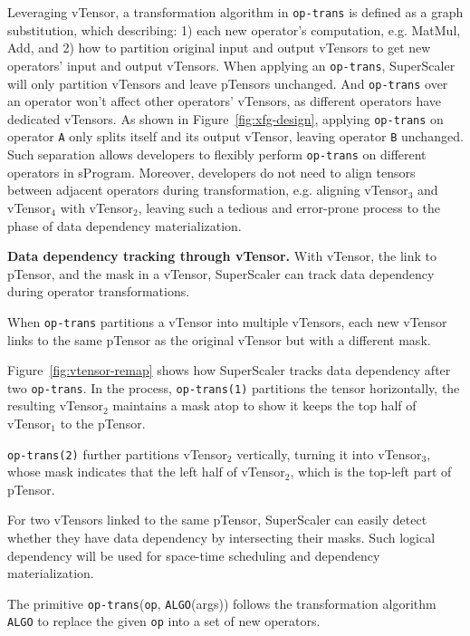 Leveraging vTensor, a transformation algorithm in \texttt{op-trans} is defined as a graph substitution, which describing: 1) each new operator's computation, e.g. MatMul, Add, and 2) how to partition original input and output vTensors to get new operators' input and output vTensors. When applying an \texttt{op-trans}, {SuperScaler} will only partition vTensors and leave {pTensor}s unchanged. And \texttt{op-trans} over an operator won't affect other operators' vTensors, as different operators have dedicated vTensors. As shown in Figure~\ref{fig:xfg-design}, applying \texttt{op-trans} on operator \texttt{A} only splits itself and its output vTensor, leaving operator \texttt{B} unchanged. Such separation allows developers to flexibly perform \texttt{op-trans} on different operators in {sProgram}. Moreover, developers do not need to align tensors between adjacent operators during transformation, e.g. aligning vTensor$_3$ and vTensor$_4$ with vTensor$_2$, leaving such a tedious and error-prone process to the phase of data dependency materialization. 

{\bf  Data dependency tracking through vTensor. } With vTensor, the link to pTensor, and the mask in a vTensor, {SuperScaler} can track data dependency during operator transformations.

When \texttt{op-trans} partitions a vTensor into multiple vTensors, each new vTensor links to the same {pTensor} as the original vTensor but with a different mask.

Figure~\ref{fig:vtensor-remap} shows how {SuperScaler} tracks data dependency after two \texttt{op-trans}. 
In the process, \texttt{op-trans(1)} partitions the tensor horizontally, the resulting {vTensor$_{2}$} maintains a mask atop to show it keeps the top half of {vTensor$_{1}$} to the pTensor.

\texttt{op-trans(2)} further partitions {vTensor$_{2}$} vertically, turning it into {vTensor$_{3}$}, whose mask indicates that the left half of {vTensor$_{2}$}, which is the top-left part of {pTensor}.

For two vTensors linked to the same pTensor, {SuperScaler} can easily detect whether they have data dependency by intersecting their masks. Such logical dependency will be used for space-time scheduling and dependency materialization.

 The primitive \texttt{op-trans}(\texttt{op}, \texttt{ALGO}(args)) follows the transformation algorithm \texttt{ALGO} to replace the given \texttt{op} into a set of new operators.


